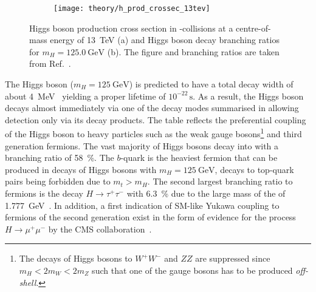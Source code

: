 \begin{figure}[htbp]
  \centering

  \begin{subfigure}[b]{0.47\textwidth}
    \centering

    \texttt{[image: theory/h\_prod\_crossec\_13tev]}

    \label{fig:higgs_prod_xsec}
  \end{subfigure}\hfill%
  \begin{subfigure}[b]{0.47\textwidth}
    \centering

    \renewcommand{\arraystretch}{1.1}%
    

    \vspace*{1.2em}

    \label{tab:higgs_branching_ratios}
  \end{subfigure}

  \caption{Higgs boson production cross section in \pp-collisions at a
    centre-of-mass energy of \SI{13}{\TeV} (a) and Higgs boson decay branching
    ratios for $m_{H} = \SI{125.0}{\GeV}$ (b). The figure and branching ratios
    are taken from Ref.~\cite{deFlorian:2016spz}.}
\end{figure}

The Higgs boson ($m_{H} = \SI{125}{\GeV}$) is predicted to have a total decay
width of about \SI{4}{\MeV}~\cite{deFlorian:2016spz} yielding a proper lifetime
of $10^{-22}\,\si{\second}$. As a result, the Higgs boson decays almost
immediately via one of the decay modes summarised in
 allowing detection only via its decay
products. The table reflects the preferential coupling of the Higgs boson to
heavy particles such as the weak gauge bosons\footnote{The decays of Higgs
  bosons to $W^+W^-$ and $ZZ$ are suppressed since $m_{H} < 2 m_{W} < 2 m_{Z}$
  such that one of the gauge bosons has to be produced \emph{off-shell}.} and
third generation fermions. The vast majority of Higgs bosons decay into \bbbar
with a branching ratio of \SI{58}{\percent}. The $b$-quark is the heaviest
fermion that can be produced in decays of Higgs bosons with
$m_H = \SI{125}{\GeV}$, decays to top-quark pairs being forbidden due to
$m_t > m_H$. The second largest branching ratio to fermions is the decay
$H \to \tau^+ \tau^-$ with \SI{6.3}{\percent} due to the large mass of the
\taulepton of \SI{1.777}{\GeV}~\cite{pdg2020}. In addition, a first indication
of SM-like Yukawa coupling to fermions of the second generation exist in the
form of evidence for the process $H \to \mu^+ \mu^-$ by the CMS
collaboration~\cite{CMS-HIG-19-006}.


